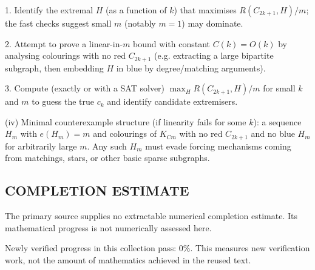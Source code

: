 1. Identify the extremal $H$ (as a function of $k$) that maximises $R(C_{2k+1},H)/m$; the fast checks suggest small $m$ (notably $m=1$) may dominate.

2. Attempt to prove a linear-in-$m$ bound with constant $C(k)=O(k)$ by analysing colourings with no red $C_{2k+1}$ (e.g. extracting a large bipartite subgraph, then embedding $H$ in blue by degree/matching arguments).

3. Compute (exactly or with a SAT solver) $\max_H R(C_{2k+1},H)/m$ for small $k$ and $m$ to guess the true $c_k$ and identify candidate extremisers.

(iv) Minimal counterexample structure (if linearity fails for some $k$): a sequence $H_m$ with $e(H_m)=m$ and colourings of $K_{C m}$ with no red $C_{2k+1}$ and no blue $H_m$ for arbitrarily large $m$. Any such $H_m$ must evade forcing mechanisms coming from matchings, stars, or other basic sparse subgraphs.




\subsection*{COMPLETION ESTIMATE}
The primary source supplies no extractable numerical completion estimate. Its mathematical progress is not numerically assessed here.

Newly verified progress in this collection pass: $0\%$. This measures new verification work, not the amount of mathematics achieved in the reused text.
